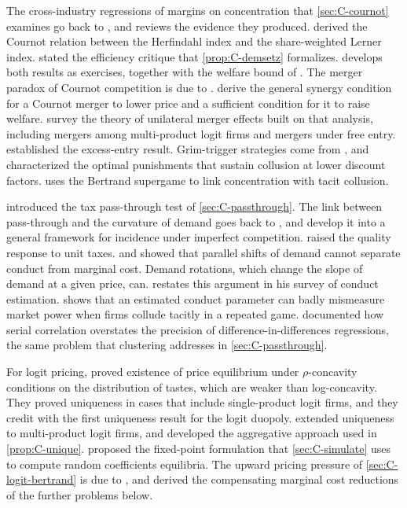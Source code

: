The cross-industry regressions of margins on concentration that \cref{sec:C-cournot} examines go back to
\citet{Bain1951}, and \citet{Schmalensee1989} reviews the evidence they produced. \citet{CowlingWaterson1976} derived
the Cournot relation between the Herfindahl index and the share-weighted Lerner index. \citet{Demsetz1973} stated
the efficiency critique that \cref{prop:C-demsetz} formalizes. \citet[Section~5.5]{Tirole1988} develops both results as
exercises, together with the welfare bound of \citet{DansbyWillig1979}. The merger paradox of Cournot competition is
due to \citet{SalantSwitzerReynolds1983}. \citet{FarrellShapiro1990} derive the general synergy condition for a Cournot
merger to lower price and a sufficient condition for it to raise welfare. \citet[Section~3.3]{AskerNocke2021} survey
the theory of unilateral merger effects built on that analysis, including mergers among multi-product logit firms and
mergers under free entry. \citet{MankiwWhinston1986} established the excess-entry result. Grim-trigger strategies
come from \citet{Friedman1971}, and \citet{Abreu1986} characterized the optimal punishments that sustain collusion at
lower discount factors. \citet[Section~6.3.2.1]{Tirole1988} uses the Bertrand supergame to link concentration with
tacit collusion.

\citet{Sumner1981} introduced the tax pass-through test of \cref{sec:C-passthrough}. The link between pass-through
and the curvature of demand goes back to \citet{BulowPfleiderer1983}, and \citet{WeylFabinger2013} develop it into a
general framework for incidence under imperfect competition. \citet{Barzel1976} raised the quality response to unit
taxes. \citet{Bresnahan1982} and \citet{Lau1982} showed that parallel shifts of demand cannot separate conduct
from marginal cost. Demand rotations, which change the slope of demand at a given price, can. \citet{Bresnahan1989}
restates this argument in his survey of conduct estimation. \citet{Corts1999} shows that an estimated conduct
parameter can badly mismeasure market power when firms collude tacitly in a repeated game.
\citet{BertrandDufloMullainathan2004} documented how serial correlation overstates the precision of
difference-in-differences regressions, the same problem that clustering addresses in \cref{sec:C-passthrough}.

For logit pricing, \citet{CaplinNalebuff1991} proved existence of price equilibrium under $\rho$-concavity conditions
on the distribution of tastes, which are weaker than log-concavity. They proved uniqueness in cases that include
single-product logit firms, and they credit \citet{AndersonDePalma1988} with the first uniqueness result for the logit
duopoly.
\citet{KonovalovSandor2010} extended uniqueness to multi-product logit firms, and \citet{NockeSchutz2018} developed
the aggregative approach used in \cref{prop:C-unique}. \citet{MorrowSkerlos2011} proposed the fixed-point
formulation that \cref{sec:C-simulate} uses to compute random coefficients equilibria. The upward pricing pressure of
\cref{sec:C-logit-bertrand} is due to \citet{FarrellShapiro2010}, and \citet{Werden1996} derived the compensating
marginal cost reductions of the further problems below.

